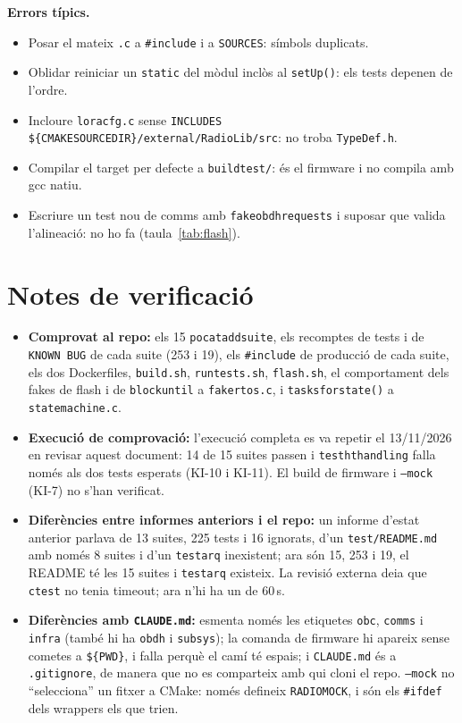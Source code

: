 \documentclass[11pt,a4paper]{article}
\DeclareRobustCommand{\_}{\textunderscore\allowbreak}
\newcommand{\cd}[1]{\texttt{#1}}
\begin{document}
\textbf{Errors típics.}
\begin{itemize}
\item Posar el mateix \cd{.c} a \cd{\#include} i a \cd{SOURCES}: símbols duplicats.
\item Oblidar reiniciar un \cd{static} del mòdul inclòs al \cd{setUp()}: els tests depenen de l'ordre.
\item Incloure \cd{lora\_cfg.c} sense \cd{INCLUDES \$\{CMAKE\_SOURCE\_DIR\}/external/RadioLib/src}: no troba \cd{TypeDef.h}.
\item Compilar el target per defecte a \cd{build\_test/}: és el firmware i no compila amb gcc natiu.
\item Escriure un test nou de comms amb \cd{fake\_obdh\_requests} i suposar que valida l'alineació: no ho fa (taula~\ref{tab:flash}).
\end{itemize}

\appendix
\section{Notes de verificació}

\begin{itemize}
\item \textbf{Comprovat al repo:} els 15 \cd{pocat\_add\_suite}, els recomptes de tests i de
  \cd{KNOWN BUG} de cada suite (253 i 19), els \cd{\#include} de producció de cada suite, els
  dos Dockerfiles, \cd{build.sh}, \cd{run\_tests.sh}, \cd{flash.sh}, el comportament dels fakes de
  flash i de \cd{block\_until} a \cd{fake\_rtos.c}, i \cd{tasks\_for\_state()} a \cd{state\_machine.c}.
\item \textbf{Execució de comprovació:} l'execució completa es va repetir el 13/11/2026 en revisar
  aquest document: 14 de 15 suites passen i \cd{test\_ht\_handling} falla només als dos tests
  esperats (KI-10 i KI-11). El build de firmware i \cd{--mock} (KI-7) no s'han verificat.
\item \textbf{Diferències entre informes anteriors i el repo:} un informe d'estat anterior parlava
  de 13 suites, 225 tests i 16 ignorats, d'un \cd{test/README.md} amb només 8 suites i d'un
  \cd{test\_arq} inexistent; ara són 15, 253 i 19, el README té les 15 suites i \cd{test\_arq} existeix.
  La revisió externa deia que \cd{ctest} no tenia timeout; ara n'hi ha un de 60\,s.
\item \textbf{Diferències amb \cd{CLAUDE.md}:} esmenta només les etiquetes \cd{obc}, \cd{comms} i
  \cd{infra} (també hi ha \cd{obdh} i \cd{subsys}); la comanda de firmware hi apareix sense cometes
  a \cd{\$\{PWD\}}, i falla perquè el camí té espais; i \cd{CLAUDE.md} és a \cd{.gitignore}, de
  manera que no es comparteix amb qui cloni el repo. \cd{--mock} no ``selecciona'' un fitxer a
  CMake: només defineix \cd{RADIO\_MOCK}, i són els \cd{\#ifdef} dels wrappers els que trien.
\end{itemize}
\end{document}
